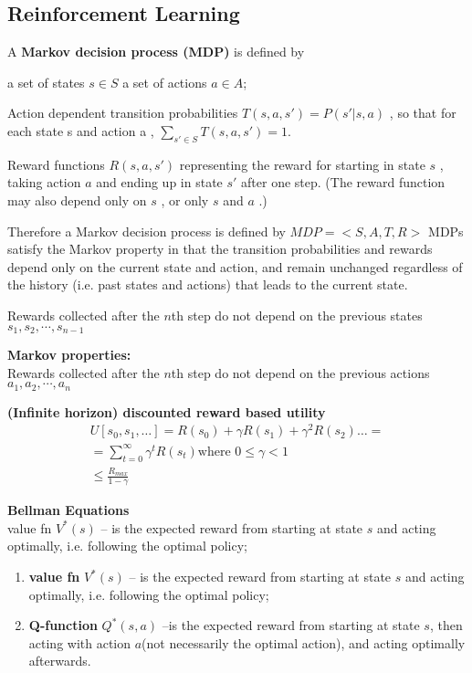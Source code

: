 \subsection{Reinforcement Learning}

A \textbf{Markov decision process (MDP)} is defined by

a set of states  $s\in S$ a set of actions $a \in A$;

Action dependent transition probabilities $T(s,a,s')=P(s'|s, a)$ , so that for each state  s  and action  a ,  $\displaystyle \sum _{s'\in S} T(s,a,s')=1$.

Reward functions $R(s, a, s')$ representing the reward for starting in state  $s$ , taking action  $a$  and ending up in state  $s'$  after one step. (The reward function may also depend only on  $s$ , or only  $s$  and  $a$ .)

Therefore a Markov decision process is defined by $MDP = <S,A,T,R>$ MDPs satisfy the Markov property in that the transition probabilities and rewards depend only on the current state and action, and remain unchanged regardless of the history (i.e. past states and actions) that leads to the current state.

Rewards collected after the  $n$th  step do not depend on the previous states $s_1,s_2,\cdots,s_{n-1}$

\textbf{Markov properties:}\\

Rewards collected after the $n$th  step do not depend on the previous actions $a_1,a_2,\cdots,a_{n}$

\textbf{(Infinite horizon) discounted reward based utility}\\

\begin{align*}
U[s_0,s_1,\ldots ]= R(s_0) + \gamma R(s_1) + \gamma ^2 R(s_2) \ldots = \\
= \sum _{t=0}^\infty \gamma ^ t R(s_ t) \text {where }0\leq \gamma <1\\
\leq \frac{R_{max}}{1-\gamma}
\end{align*}

\textbf{Bellman Equations}\\

value fn $V^{*}(s)$ --  is the expected reward from starting at state $s$ and
acting optimally, i.e. following the optimal policy;\\
\begin{enumerate}
  \item \textbf{value fn} $V^{*}(s)$ – is the expected reward from starting at state $s$ and
acting optimally, i.e. following the optimal policy;
  \item \textbf{Q-function} $Q^{*}(s,a)$ –is the expected reward from starting at state $s$, then
acting with action $a$(not necessarily the optimal action), and acting optimally
afterwards.
\end{enumerate}

